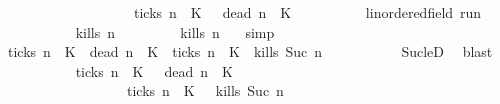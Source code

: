 \begin{isabellebody}
\ \ \ \ \ \ \ \ \ \ \ \ \ \ \ \ \ {\isasymunion}\ {\isacharparenleft}{\isacharbraceleft}{\isasymrho}{\isachardot}\ {\isacharquery}ticks\ n\ {\isasymrho}\ K\ {\isasyminter}\ {\isacharbraceleft}{\isasymrho}{\isachardot}\ {\isacharquery}dead\ n\ {\isasymrho}\ K\isanewline
\ \ \isamarkupfalse%
\isanewline
\ \ \ \ \isacommand{{\isacharbraceleft}}\isamarkupfalse%
\ \isamarkupfalse%
\ {\isasymrho}{\isacharcolon}{\isacharcolon}{\isacartoucheopen}{\isacharprime}{\isasymtau}{\isacharcolon}{\isacharcolon}linordered{\isacharunderscore}field\ run{\isacartoucheclose}\isanewline
\ \ \ \ \ \ \isamarkupfalse%
\ {\isacartoucheopen}{\isasymrho}\ {\isasymin}\ {\isacharbraceleft}{\isasymrho}{\isachardot}\ {\isacharquery}kills\ n\ {\isasymrho}{\isacharbraceright}{\isacartoucheclose}\isanewline
\ \ \ \ \ \ \isamarkupfalse%
\ {\isacartoucheopen}{\isacharquery}kills\ n\ {\isasymrho}{\isacartoucheclose}\ \isamarkupfalse%
\ simp\isanewline
\ \ \ \ \ \ \isamarkupfalse%
\ {\isacartoucheopen}{\isacharparenleft}{\isacharquery}ticks\ n\ {\isasymrho}\ K\ {\isasymand}\ {\isacharquery}dead\ n\ {\isasymrho}\ K\ {\isasymor}\ {\isacharparenleft}{\isasymnot}{\isacharquery}ticks\ n\ {\isasymrho}\ K\ {\isasymand}\ {\isacharquery}kills\ {\isacharparenleft}Suc\ n{\isacharparenright}\ {\isasymrho}{\isacharparenright}{\isacartoucheclose}\isanewline
\ \ \ \ \ \ \ \ \isamarkupfalse%
\ Suc{\isacharunderscore}leD\ \isamarkupfalse%
\ blast\isanewline
\ \ \ \ \ \ \isamarkupfalse%
\ {\isacartoucheopen}{\isasymrho}\ {\isasymin}\ {\isacharparenleft}{\isacharbraceleft}{\isasymrho}{\isachardot}\ {\isacharquery}ticks\ n\ {\isasymrho}\ K\ {\isasyminter}\ {\isacharbraceleft}{\isasymrho}{\isachardot}\ {\isacharquery}dead\ n\ {\isasymrho}\ K\isanewline
\ \ \ \ \ \ \ \ \ \ \ \ \ \ \ {\isasymunion}\ {\isacharparenleft}{\isacharbraceleft}{\isasymrho}{\isachardot}\ {\isasymnot}\ {\isacharquery}ticks\ n\ {\isasymrho}\ K\ {\isasyminter}\ {\isacharbraceleft}{\isasymrho}{\isachardot}\ {\isacharquery}kills\ {\isacharparenleft}Suc\ n{\isacharparenright}\ {\isasymrho}{\isacharbraceright}{\isacharparenright}{\isacartoucheclose}\isanewline

\end{isabellebody}
